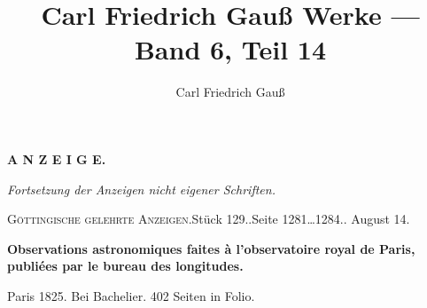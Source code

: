 \documentclass[12pt,a4paper]{article}
\title{Carl Friedrich Gau\ss{} Werke --- Band 6, Teil 14}
\author{Carl Friedrich Gau\ss}
\date{}
\newcommand{\anzeigeheading}[4]{%
    \begin{center}
    \small\textsc{G\"ottingische gelehrte Anzeigen.}\quad St\"uck #1.\quad Seite #2.\quad #3
    \end{center}
    \vspace{-2mm}
    \begin{center}\small\textbf{#4}\end{center}
    \vspace{2mm}
}
\begin{document}
\maketitle
\thispagestyle{empty}

\vspace{1cm}

\begin{center}
\Large\textbf{A N Z E I G E.}
\end{center}

\vspace{0.5cm}

\noindent\small\textit{Fortsetzung der Anzeigen nicht eigener Schriften.}

\vspace{0.5cm}

\anzeigeheading{129.}{1281\dots 1284.}{1826 August 14.}{Observations astronomiques faites \`a l'observatoire royal de Paris, publi\'ees par le bureau des longitudes.}

\begin{otherlanguage}{french}
\noindent\small Paris 1825. Bei Bachelier. 402 Seiten in Folio.
\end{otherlanguage}

\vspace{2mm}
\end{document}
